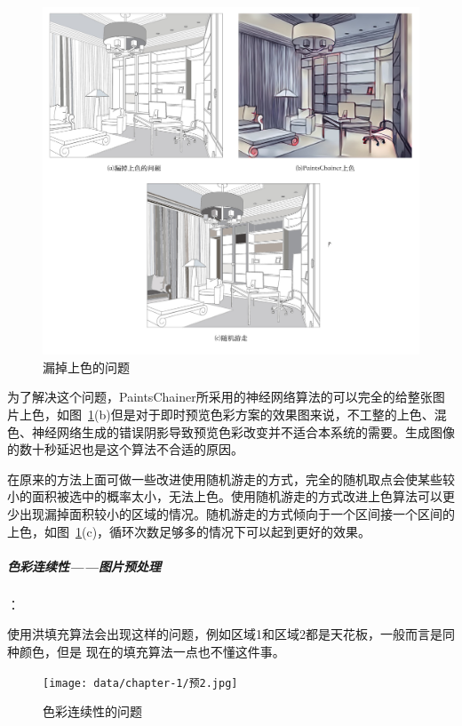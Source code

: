 \begin{figure}[!htbp]
\centering
\includegraphics[width=\linewidth,keepaspectratio]{data/chapter-1/预览2.jpg}
\caption{漏掉上色的问题}
\label{figure:漏掉上色面积的问题以及解决办法}
\end{figure}

为了解决这个问题，PaintsChainer所采用的神经网络算法的可以完全的给整张图片上色，如图~\ref{figure:漏掉上色面积的问题以及解决办法}(b)但是对于即时预览色彩方案的效果图来说，不工整的上色、混色、神经网络生成的错误阴影导致预览色彩改变并不适合本系统的需要。生成图像的数十秒延迟也是这个算法不合适的原因。

在原来的方法上面可做一些改进使用随机游走的方式，完全的随机取点会使某些较小的面积被选中的概率太小，无法上色。使用随机游走的方式改进上色算法可以更少出现漏掉面积较小的区域的情况。随机游走的方式倾向于一个区间接一个区间的上色，如图~\ref{figure:漏掉上色面积的问题以及解决办法}(c)，循环次数足够多的情况下可以起到更好的效果。

\subparagraph{色彩连续性——图片预处理}：

使用洪填充算法会出现这样的问题，例如区域1和区域2都是天花板，一般而言是同种颜色，但是
现在的填充算法一点也不懂这件事。

\begin{figure}[!htbp]
\centering
\texttt{[image: data/chapter-1/预2.jpg]}
\caption{色彩连续性的问题}
\label{figure:漏掉上色面积的问题}
\end{figure}


